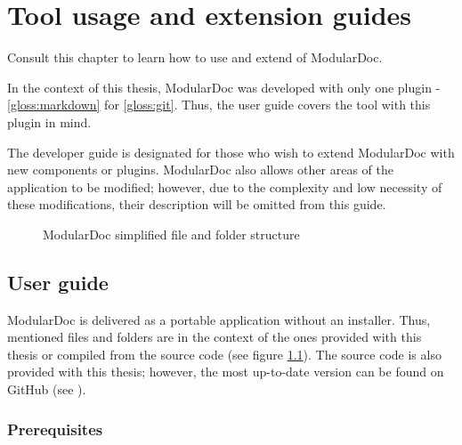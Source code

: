 \chapter{Tool usage and extension guides}

Consult this chapter to learn how to use and extend of ModularDoc.

In the context of this thesis, ModularDoc was developed with only one plugin - \ref{gloss:markdown} for \ref{gloss:git}.
Thus, the user guide covers the tool with this plugin in mind.

The developer guide is designated for those who wish to extend ModularDoc with new components or plugins.
ModularDoc also allows other areas of the application to be modified; however, due to the complexity and low necessity of these modifications, their description will be omitted from this guide.

\begin{figure}[H]
    \caption{ModularDoc simplified file and folder structure}
    \label{fig:applicationFileStructure}
\end{figure}

\section{User guide}

ModularDoc is delivered as a portable application without an installer. Thus, mentioned files and folders are in the context of the ones provided with this thesis or compiled from the source code (see figure \ref{fig:applicationFileStructure}). The source code is also provided with this thesis; however, the most up-to-date version can be found on GitHub (see ).

\subsection{Prerequisites}


